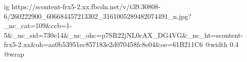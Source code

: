  
 
 
 
 

\ifcmt
  ig https://scontent-frx5-2.xx.fbcdn.net/v/t39.30808-6/260222900_606684457213302_3161005289482074491_n.jpg?_nc_cat=109&ccb=1-5&_nc_sid=730e14&_nc_ohc=p7SR22jNL0cAX_DG4VG&_nc_ht=scontent-frx5-2.xx&oh=aa0b53951ec857183e2d070458fc8e04&oe=61B211C6
  @width 0.4
  @wrap 
\fi
